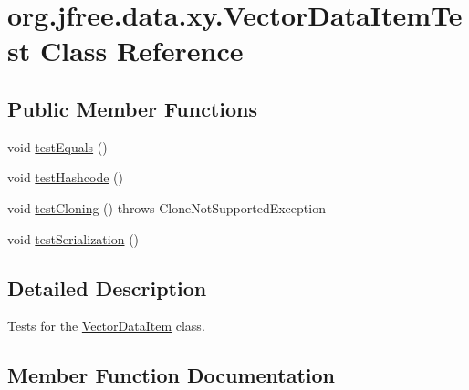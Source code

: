 \hypertarget{classorg_1_1jfree_1_1data_1_1xy_1_1_vector_data_item_test}{}\section{org.\+jfree.\+data.\+xy.\+Vector\+Data\+Item\+Test Class Reference}
\label{classorg_1_1jfree_1_1data_1_1xy_1_1_vector_data_item_test}
\subsection*{Public Member Functions}
\begin{DoxyCompactItemize}
\item 
void \mbox{\hyperlink{classorg_1_1jfree_1_1data_1_1xy_1_1_vector_data_item_test_ae5921eddb9f16ef7911412d8965f7b24}{test\+Equals}} ()
\item 
void \mbox{\hyperlink{classorg_1_1jfree_1_1data_1_1xy_1_1_vector_data_item_test_a595fd75b8c288ddf5559b8cbd2c32b6b}{test\+Hashcode}} ()
\item 
void \mbox{\hyperlink{classorg_1_1jfree_1_1data_1_1xy_1_1_vector_data_item_test_a8770df58f1df9129c415b196067644e8}{test\+Cloning}} ()  throws Clone\+Not\+Supported\+Exception 
\item 
void \mbox{\hyperlink{classorg_1_1jfree_1_1data_1_1xy_1_1_vector_data_item_test_a8cf4960357532b7668b1f0c51a47a0d5}{test\+Serialization}} ()
\end{DoxyCompactItemize}


\subsection{Detailed Description}
Tests for the \mbox{\hyperlink{classorg_1_1jfree_1_1data_1_1xy_1_1_vector_data_item}{Vector\+Data\+Item}} class. 

\subsection{Member Function Documentation}
\mbox{\label{classorg_1_1jfree_1_1data_1_1xy_1_1_vector_data_item_test_a8770df58f1df9129c415b196067644e8}} 
